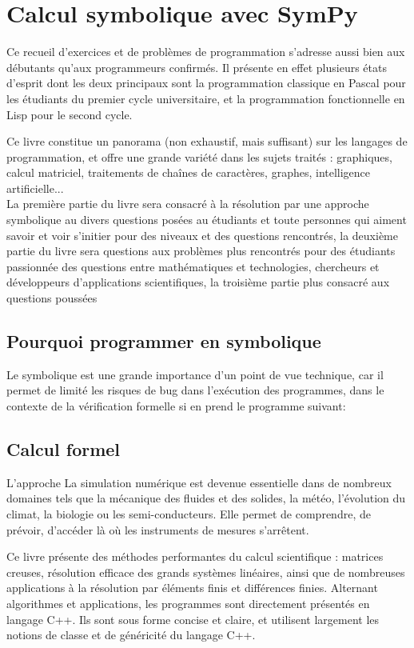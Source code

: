 \section{Calcul symbolique avec SymPy}
Ce recueil d'exercices et de problèmes de programmation s'adresse aussi bien aux débutants qu'aux programmeurs confirmés. Il présente en effet plusieurs états d'esprit dont les deux principaux sont la programmation classique en Pascal pour les étudiants du premier cycle universitaire, et la programmation fonctionnelle en Lisp pour le second cycle.

Ce livre constitue un panorama (non exhaustif, mais suffisant) sur les langages de programmation, et offre une grande variété dans les sujets traités : graphiques, calcul matriciel, traitements de chaînes de caractères, graphes, intelligence artificielle...
\\
La première partie du livre sera consacré \`a la résolution par une approche symbolique au divers questions posées au étudiants et toute personnes qui aiment savoir et voir s'initier  pour des niveaux et des questions rencontrés, la deuxième partie du livre sera questions aux problèmes plus rencontrés pour des étudiants passionnée des questions entre mathématiques et technologies, chercheurs et développeurs d'applications scientifiques, la troisième partie plus consacré aux questions poussées

\subsection{Pourquoi programmer en symbolique }
Le symbolique est une grande importance d'un point de vue technique, car il permet
de limité les risques de bug dans l'exécution des programmes, dans le contexte de 
la vérification formelle si en prend le programme suivant:

\subsection{Calcul formel}

L'approche La simulation numérique est devenue essentielle dans de nombreux domaines tels que la mécanique des fluides et des solides, la météo, l'évolution du climat, la biologie ou les semi-conducteurs. Elle permet de comprendre, de prévoir, d'accéder là où les instruments de mesures s'arrêtent. 

Ce livre présente des méthodes performantes du calcul scientifique : matrices creuses, résolution efficace des grands systèmes linéaires, ainsi que de nombreuses applications à la résolution par éléments finis et différences finies. Alternant algorithmes et applications, les programmes sont directement présentés en langage C++. Ils sont sous forme concise et claire, et utilisent largement les notions de classe et de généricité du langage C++. 

